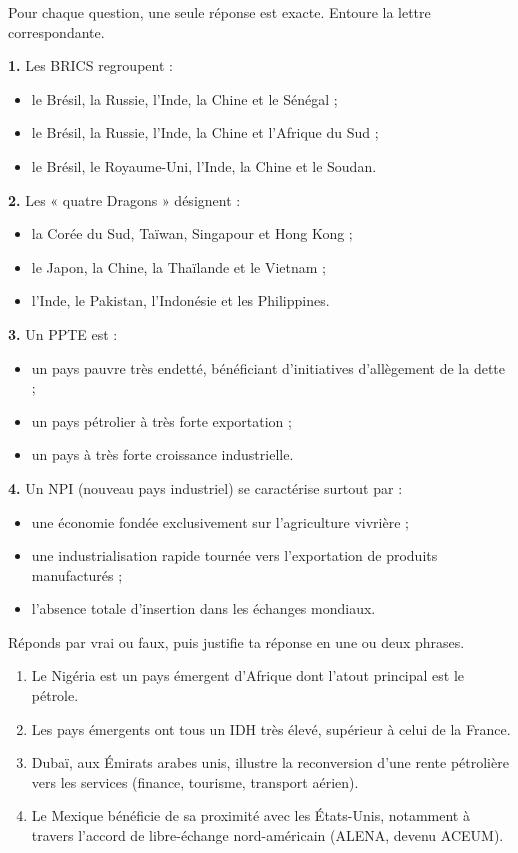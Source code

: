 \documentclass[11pt]{article}
\begin{document}
\begin{exercice}
Pour chaque question, une seule réponse est exacte. Entoure la lettre correspondante.

\textbf{1.} Les BRICS regroupent :
\begin{itemize}
\item[a)] le Brésil, la Russie, l'Inde, la Chine et le Sénégal ;
\item[b)] le Brésil, la Russie, l'Inde, la Chine et l'Afrique du Sud ;
\item[c)] le Brésil, le Royaume-Uni, l'Inde, la Chine et le Soudan.
\end{itemize}

\textbf{2.} Les « quatre Dragons » désignent :
\begin{itemize}
\item[a)] la Corée du Sud, Taïwan, Singapour et Hong Kong ;
\item[b)] le Japon, la Chine, la Thaïlande et le Vietnam ;
\item[c)] l'Inde, le Pakistan, l'Indonésie et les Philippines.
\end{itemize}

\textbf{3.} Un PPTE est :
\begin{itemize}
\item[a)] un pays pauvre très endetté, bénéficiant d'initiatives d'allègement de la dette ;
\item[b)] un pays pétrolier à très forte exportation ;
\item[c)] un pays à très forte croissance industrielle.
\end{itemize}

\textbf{4.} Un NPI (nouveau pays industriel) se caractérise surtout par :
\begin{itemize}
\item[a)] une économie fondée exclusivement sur l'agriculture vivrière ;
\item[b)] une industrialisation rapide tournée vers l'exportation de produits manufacturés ;
\item[c)] l'absence totale d'insertion dans les échanges mondiaux.
\end{itemize}
\end{exercice}

\begin{exercice}
Réponds par vrai ou faux, puis justifie ta réponse en une ou deux phrases.
\begin{enumerate}
\item Le Nigéria est un pays émergent d'Afrique dont l'atout principal est le pétrole.
\item Les pays émergents ont tous un IDH très élevé, supérieur à celui de la France.
\item Dubaï, aux Émirats arabes unis, illustre la reconversion d'une rente pétrolière vers les services (finance, tourisme, transport aérien).
\item Le Mexique bénéficie de sa proximité avec les États-Unis, notamment à travers l'accord de libre-échange nord-américain (ALENA, devenu ACEUM).
\end{enumerate}
\end{exercice}
\end{document}
